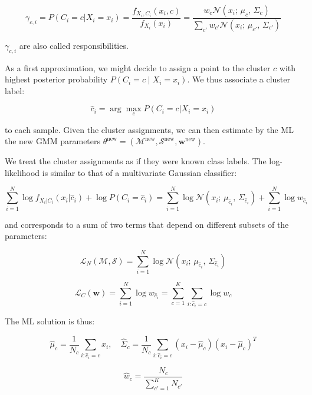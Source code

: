 \begin{equation*}
\gamma_{c,i} = P(C_i = c | X_i = x_i) = \frac{f_{X_i, C_i}(x_i, c)}{f_{X_i}(x_i)} = \frac{w_c \mathcal{N}(x_i;\, \mu_c,\, \Sigma_c)}{\sum_{c'} w_{c'} \mathcal{N}(x_i;\, \mu_{c'},\, \Sigma_{c'})}
\end{equation*}

$\gamma_{c,i}$ are also called responsibilities.

As a first approximation, we might decide to assign a point to the cluster $c$ with highest posterior probability $P(C_i = c \mid X_i = x_i)$. We thus associate a cluster label:


\begin{equation*}
\hat{c}_i = \arg\max_c P(C_i = c | X_i = x_i)
\end{equation*}

to each sample. Given the cluster assignments, we can then estimate by the ML the new GMM parameters $\theta^{\text{new}} = (\mathcal{M}^{\text{new}}, \mathcal{S}^{\text{new}}, \mathbf{w}^{\text{new}})$.

We treat the cluster assignments as if they were known class labels. The log-likelihood is similar to that of a multivariate Gaussian classifier:

\[
\sum_{i=1}^N \log f_{X_i|C_i}(x_i|\hat{c}_i) + \log P(C_i = \hat{c}_i) = \sum_{i=1}^N \log \mathcal{N}(x_i;\, \mu_{\hat{c}_i},\, \Sigma_{\hat{c}_i}) + \sum_{i=1}^N \log w_{\hat{c}_i}
\]

and corresponds to a sum of two terms that depend on different subsets of the parameters:


\begin{equation*}
\mathcal{L}_N(\mathcal{M}, \mathcal{S}) = \sum_{i=1}^N \log \mathcal{N}(x_i;\, \mu_{\hat{c}_i},\, \Sigma_{\hat{c}_i})
\end{equation*}


\begin{equation*}
\mathcal{L}_C(\mathbf{w}) = \sum_{i=1}^N \log w_{\hat{c}_i} = \sum_{c=1}^K \sum_{i: \hat{c}_i = c} \log w_c
\end{equation*}

The ML solution is thus:


\begin{equation*}
\hat{\mu}_c = \frac{1}{N_c} \sum_{i: \hat{c}_i = c} x_i, \quad \hat{\Sigma}_c = \frac{1}{N_c} \sum_{i: \hat{c}_i = c} (x_i - \hat{\mu}_c)(x_i - \hat{\mu}_c)^T
\end{equation*}


\begin{equation*}
\hat{w}_c = \frac{N_c}{\sum_{c'=1}^K N_{c'}}
\end{equation*}


